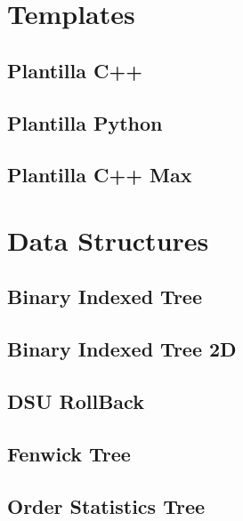 \section{Templates}
\subsection{Plantilla C++}
\raggedbottom
\hrulefill
\subsection{Plantilla Python}
\raggedbottom
\hrulefill
\subsection{Plantilla C++ Max}
\raggedbottom
\hrulefill
\newpage

\section{Data Structures}
\subsection{Binary Indexed Tree}
\raggedbottom
\hrulefill
\subsection{Binary Indexed Tree 2D}
\raggedbottom
\hrulefill
\subsection{DSU RollBack}
\raggedbottom
\hrulefill
\subsection{Fenwick Tree}
\raggedbottom
\hrulefill
\subsection{Order Statistics Tree}
\raggedbottom
\hrulefill
